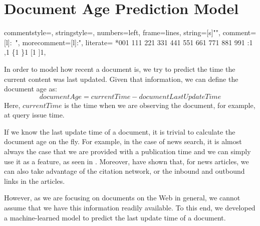 \chapter{Document Age Prediction Model}
\label{ch:doc}


{
  commentstyle=\color{eclipseStrings}, %
  stringstyle=\color{eclipseKeywords}, %
  numbers=left,
  frame=lines,
  string=[s]{"}{"},
  comment=[l]{:\ "},
  morecomment=[l]{:"},
  literate=
  *{0}{{{\color{numb}0}}}{1}
  {1}{{{\color{numb}1}}}{1}
  {2}{{{\color{numb}2}}}{1}
  {3}{{{\color{numb}3}}}{1}
  {4}{{{\color{numb}4}}}{1}
  {5}{{{\color{numb}5}}}{1}
  {6}{{{\color{numb}6}}}{1}
  {7}{{{\color{numb}7}}}{1}
  {8}{{{\color{numb}8}}}{1}
  {9}{{{\color{numb}9}}}{1}
  {:}{{{\color{punct}{:}}}}{1}
  {,}{{{\color{punct}{,}}}}{1}
  {\{}{{{\color{delim}{\{}}}}{1}
  {\}}{{{\color{delim}{\}}}}}{1}
  {[}{{{\color{delim}{[}}}}{1}
  {]}{{{\color{delim}{]}}}}{1},
}

In order to model how recent a document is, we try to predict the time the current content was last updated. Given that information, we can define the document age as:
\[ documentAge = currentTime - documentLastUpdateTime \]
Here, $currentTime$ is the time when we are observing the document, for example, at query issue time.

If we know the last update time of a document, it is trivial to calculate the document age on the fly. For example, in the case of news search, it is almost always the case that we are provided with a publication time and we can simply use it as a feature, as seen in \citep{dakka2012answering}. Moreover, \citet{spitz2018predicting} have shown that, for news articles, we can also take advantage of the citation network, or the inbound and outbound links in the articles.

However, as we are focusing on documents on the Web in general, we cannot assume that we have this information readily available. To this end, we developed a machine-learned model to predict the last update time of a document.


